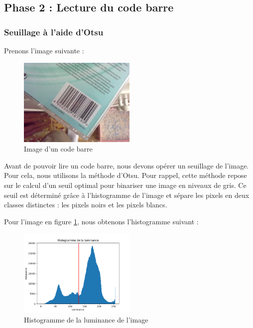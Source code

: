 \documentclass{rapport}
\begin{document}
\subsection{Phase 2 : Lecture du code barre}

\subsubsection*{Seuillage à l'aide d'Otsu}
Prenons l'image suivante :
\begin{figure}[H] %
	\centering
	\includegraphics[width=0.5\textwidth]{images/barcode0.jpg}
	\caption{Image d'un code barre}
	\label{code_barre}
\end{figure}

Avant de pouvoir lire un code barre, nous devons opérer un seuillage de l'image. Pour cela, nous utilisons la méthode d'Otsu.
Pour rappel, cette méthode repose sur le calcul d'un seuil optimal pour binariser une image en niveaux de gris.
Ce seuil est déterminé grâce à l'histogramme de l'image et sépare les pixels en deux classes distinctes : les pixels noirs et les pixels blancs.

Pour l'image en figure \ref{code_barre}, nous obtenons l'histogramme suivant :

\begin{figure}[H] 
	\centering
	\includegraphics[width=0.5\textwidth]{images/histogramme.png}
	\caption{Histogramme de la luminance de l'image}
	\label{histogramme}
\end{figure}
\end{document}
